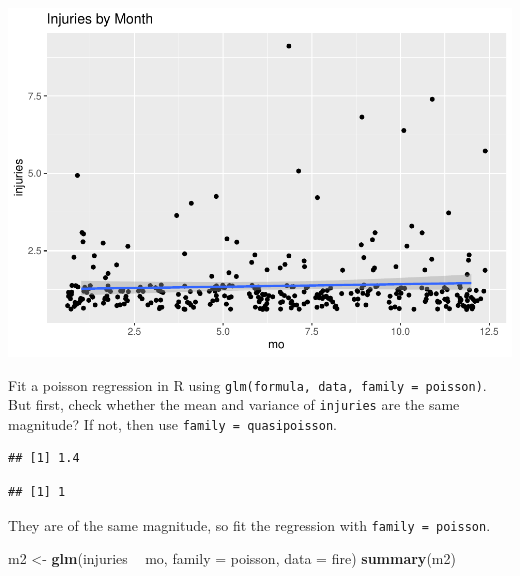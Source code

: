 \documentclass[
]{book}
\newenvironment{Shaded}{\begin{snugshade}}{\end{snugshade}}
\newcommand{\DataTypeTok}[1]{\textcolor[rgb]{0.13,0.29,0.53}{#1}}
\newcommand{\KeywordTok}[1]{\textcolor[rgb]{0.13,0.29,0.53}{\textbf{#1}}}
\newcommand{\NormalTok}[1]{#1}
\newcommand{\OperatorTok}[1]{\textcolor[rgb]{0.81,0.36,0.00}{\textbf{#1}}}
\newcommand{\StringTok}[1]{\textcolor[rgb]{0.31,0.60,0.02}{#1}}
\begin{document}
\includegraphics{data-sci_files/figure-latex/unnamed-chunk-48-1.pdf}

Fit a poisson regression in R using \texttt{glm(formula,\ data,\ family\ =\ poisson)}. But first, check whether the mean and variance of \texttt{injuries} are the same magnitude? If not, then use \texttt{family\ =\ quasipoisson}.

\begin{Shaded}
\end{Shaded}

\begin{verbatim}
## [1] 1.4
\end{verbatim}

\begin{Shaded}
\end{Shaded}

\begin{verbatim}
## [1] 1
\end{verbatim}

They are of the same magnitude, so fit the regression with \texttt{family\ =\ poisson}.

\begin{Shaded}
\begin{Highlighting}[]
\NormalTok{m2 <-}\StringTok{ }\KeywordTok{glm}\NormalTok{(injuries }\OperatorTok{~}\StringTok{ }\NormalTok{mo, }\DataTypeTok{family =}\NormalTok{ poisson, }\DataTypeTok{data =}\NormalTok{ fire)}
\KeywordTok{summary}\NormalTok{(m2)}
\end{Highlighting}
\end{Shaded}
\end{document}
